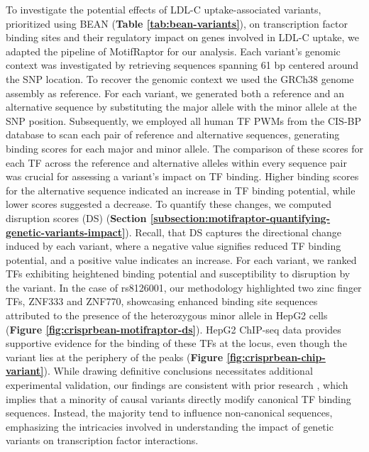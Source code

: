 \documentclass[a4paper, titlepage, openright]{book}
\newcommand{\motifraptor}{MotifRaptor\xspace}
\begin{document}
To investigate the potential effects of LDL-C uptake-associated variants, prioritized using BEAN (\textbf{Table \ref{tab:bean-variants}}), on transcription factor binding sites and their regulatory impact on genes involved in LDL-C uptake, we adapted the pipeline of \motifraptor for our analysis. Each variant's genomic context was investigated by retrieving sequences spanning 61 bp centered around the SNP location. To recover the genomic context we used the GRCh38 genome assembly as reference. For each variant, we generated both a reference and an alternative sequence by substituting the major allele with the minor allele at the SNP position. Subsequently, we employed all human TF PWMs from the CIS-BP database \citep{weirauch2014determination} to scan each pair of reference and alternative sequences, generating binding scores for each major and minor allele. The comparison of these scores for each TF across the reference and alternative alleles within every sequence pair was crucial for assessing a variant's impact on TF binding. Higher binding scores for the alternative sequence indicated an increase in TF binding potential, while lower scores suggested a decrease. To quantify these changes, we computed disruption scores (DS) (\textbf{Section \ref{subsection:motifraptor-quantifying-genetic-variants-impact}}). Recall, that DS captures the directional change induced by each variant, where a negative value signifies reduced TF binding potential, and a positive value indicates an increase. For each variant, we ranked TFs exhibiting heightened binding potential and susceptibility to disruption by the variant. In the case of rs8126001, our methodology highlighted two zinc finger TFs, ZNF333 and ZNF770, showcasing enhanced binding site sequences attributed to the presence of the heterozygous minor allele in HepG2 cells (\textbf{Figure \ref{fig:crisprbean-motifraptor-ds}}). HepG2 ChIP-seq data provides supportive evidence for the binding of these TFs at the locus, even though the variant lies at the periphery of the peaks (\textbf{Figure \ref{fig:crisprbean-chip-variant}}). While drawing definitive conclusions necessitates additional experimental validation, our findings are consistent with prior research \citep{farh2015genetic}, which implies that a minority of causal variants directly modify canonical TF binding sequences. Instead, the majority tend to influence non-canonical sequences, emphasizing the intricacies involved in understanding the impact of genetic variants on transcription factor interactions.
\end{document}
